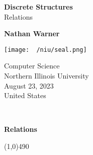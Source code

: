 \documentclass{report}
\title{\Huge{}}
\author{\huge{Nathan Warner}}
\date{\huge{}}
\begin{document}
        \begin{titlepage}
       \begin{center}
           \vspace*{1cm}
    
           \textbf{Discrete Structures} \\
           Relations
    
           \vspace{0.5cm}
            
                
           \vspace{1.5cm}
    
           \textbf{Nathan Warner}
    
           \vfill
                
                
           \vspace{0.8cm}
         
           \texttt{[image: ~/niu/seal.png]}
                
           Computer Science\\
           Northern Illinois University\\
           August 23, 2023\\
           United States\\
           
                
       \end{center}
    \end{titlepage}
    \tableofcontents
    \pagebreak \bigbreak \noindent
    \vspace{2in} \\
    \begin{Huge}
       \textbf{Relations} 
    \end{Huge}
    \bigbreak \noindent 
    \line(1,0){490}
    \bigbreak \noindent 
    
\end{document}
